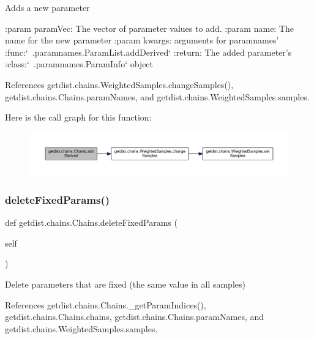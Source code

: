 \begin{DoxyVerb}Adds a new parameter

:param paramVec: The vector of parameter values to add.
:param name: The name for the new parameter
:param kwargs: arguments for paramnames' :func:`~.paramnames.ParamList.addDerived`
:return: The added parameter's :class:`~.paramnames.ParamInfo` object
\end{DoxyVerb}
 

References getdist.\+chains.\+Weighted\+Samples.\+change\+Samples(), getdist.\+chains.\+Chains.\+param\+Names, and getdist.\+chains.\+Weighted\+Samples.\+samples.

Here is the call graph for this function\+:
\nopagebreak
\begin{figure}[H]
\begin{center}
\leavevmode
\includegraphics[width=350pt]{classgetdist_1_1chains_1_1Chains_a14d289c78434f27324c29aba89ea535d_cgraph}
\end{center}
\end{figure}
\mbox{\label{classgetdist_1_1chains_1_1Chains_ad4e95f9abe55474a9d7a9d4245190cdd}} 
\subsubsection{\texorpdfstring{delete\+Fixed\+Params()}{deleteFixedParams()}}
{\footnotesize\ttfamily def getdist.\+chains.\+Chains.\+delete\+Fixed\+Params (\begin{DoxyParamCaption}\item[{}]{self }\end{DoxyParamCaption})}

\begin{DoxyVerb}Delete parameters that are fixed (the same value in all samples)
\end{DoxyVerb}
 

References getdist.\+chains.\+Chains.\+\_\+get\+Param\+Indices(), getdist.\+chains.\+Chains.\+chains, getdist.\+chains.\+Chains.\+param\+Names, and getdist.\+chains.\+Weighted\+Samples.\+samples.

